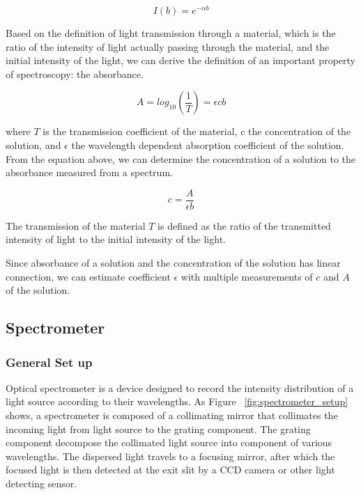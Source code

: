 \documentclass{article}
\begin{document}
\begin{equation}
    I(b) = e^{-\alpha b}
\end{equation}

Based on the definition of light transmission through a material, which is the ratio of the intensity of light actually passing through the material, and  the initial intensity of the light, we can derive the definition of an important property of spectroscopy: the absorbance.

\begin{equation}
    A = log_{10} (\frac{1}{T}) =  \epsilon c b
\end{equation}

where $T$ is the transmission coefficient of the material, c the concentration of the solution, and $\epsilon$ the wavelength dependent absorption coefficient of the solution. From the equation above, we can determine the concentration of a solution to the absorbance measured from a spectrum.

\begin{equation}
    c = \frac{A}{\epsilon b}
\end{equation}

The transmission of the material $T$ is defined as the ratio of the transmitted intensity of light to the initial intensity of the light.

Since absorbance of a solution and the concentration of the solution has linear connection, we can estimate coefficient $\epsilon$ with multiple measurements of $c$ and $A$ of the solution. 


\subsection{Spectrometer}

\subsubsection{General Set up}
Optical spectrometer is a device designed to record the intensity distribution of a light source according to their wavelengths. As Figure ~\ref{fig:spectrometer_setup} shows, a spectrometer is composed of a collimating mirror that collimates the incoming light from light source to the grating component. The grating component decompose the collimated light source into component of various wavelengths. The dispersed light travels to a focusing mirror, after which the focused light is then detected at the exit slit by a CCD camera or other light detecting sensor.  
\end{document}
